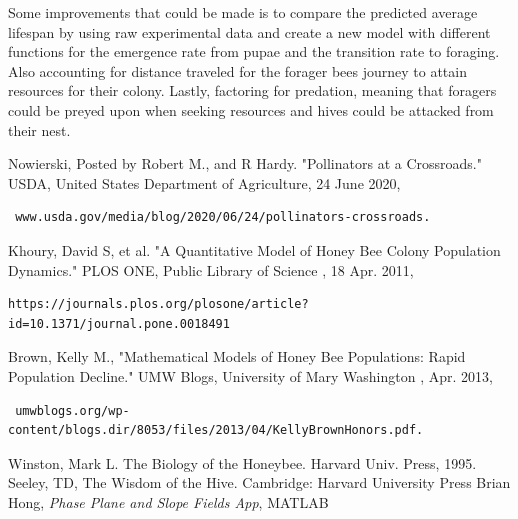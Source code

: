\documentclass[a4paper,10pt]{article}
\begin{document}
Some improvements that could be made is to compare the predicted average lifespan by using raw experimental data and create a new model with different functions for the emergence rate from pupae and the transition rate to foraging. Also accounting for distance traveled for the forager bees journey to attain resources for their colony. Lastly, factoring for predation, meaning that foragers could be preyed upon when seeking resources and hives could be attacked from their nest.

\newpage
{}
\begin{thebibliography}{}
Nowierski, Posted by Robert M., and R Hardy. "Pollinators at a Crossroads." USDA, United States Department of Agriculture, 24 June 2020, \begin{verbatim} www.usda.gov/media/blog/2020/06/24/pollinators-crossroads.\end{verbatim}
Khoury, David S, et al. "A Quantitative Model of Honey Bee Colony Population Dynamics." PLOS ONE, Public Library of Science , 18 Apr. 2011, \begin{verbatim}https://journals.plos.org/plosone/article?id=10.1371/journal.pone.0018491\end{verbatim}
Brown, Kelly M., "Mathematical Models of Honey Bee Populations: Rapid Population Decline." UMW Blogs, University of Mary Washington , Apr. 2013, \begin{verbatim} umwblogs.org/wp-content/blogs.dir/8053/files/2013/04/KellyBrownHonors.pdf. \end{verbatim}
Winston, Mark L. The Biology of the Honeybee. Harvard Univ. Press, 1995. 
Seeley, TD, The Wisdom of the Hive. Cambridge: Harvard University Press
 Brian Hong,
\emph{Phase Plane and Slope Fields App}, MATLAB
\end{thebibliography}
\end{document}
